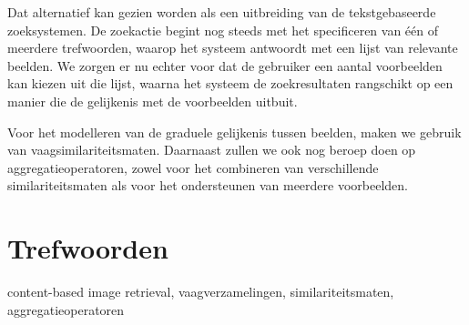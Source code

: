 Dat alternatief kan gezien worden als een uitbreiding van de tekstgebaseerde zoeksystemen.
De zoekactie begint nog steeds met het specificeren van \'e\'en of meerdere trefwoorden, waarop
het systeem antwoordt met een lijst van relevante beelden. We zorgen er nu echter voor
dat de gebruiker een aantal voorbeelden kan kiezen uit die lijst, waarna het
systeem de zoekresultaten rangschikt op een manier die de gelijkenis met de voorbeelden uitbuit.

Voor het modelleren van de graduele gelijkenis tussen beelden, maken we gebruik van 
vaagsimilariteitsmaten. Daarnaast zullen we ook nog beroep doen op aggregatieoperatoren,
zowel voor het combineren van verschillende similariteitsmaten als voor het ondersteunen van
meerdere voorbeelden. 

\section*{Trefwoorden}
content-based image retrieval, vaagverzamelingen, similariteitsmaten, aggregatieoperatoren

